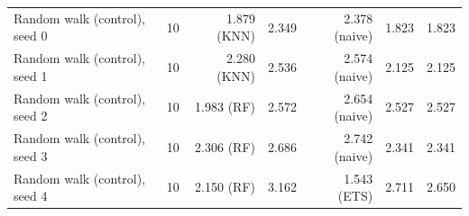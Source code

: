 \begin{table}[t]
{\begin{tabular}{@{}lrrrrrr@{}}
\midrule
Random walk (control), seed 0 & 10 & 1.879 (KNN) & 2.349 & 2.378 (naive) & 1.823 & 1.823 \\
Random walk (control), seed 1 & 10 & 2.280 (KNN) & 2.536 & 2.574 (naive) & 2.125 & 2.125 \\
Random walk (control), seed 2 & 10 & 1.983 (RF) & 2.572 & 2.654 (naive) & 2.527 & 2.527 \\
Random walk (control), seed 3 & 10 & 2.306 (RF) & 2.686 & 2.742 (naive) & 2.341 & 2.341 \\
Random walk (control), seed 4 & 10 & 2.150 (RF) & 3.162 & 1.543 (ETS) & 2.711 & 2.650 \\
\bottomrule
\end{tabular}}
\end{table}
